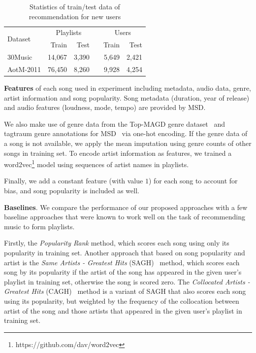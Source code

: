\begin{table}[!h]
\centering
\caption{Statistics of train/test data of recommendation for new users}
\label{tab:stats_cold}
\begin{tabular}{lrrcrr}
\toprule
\multirow{2}{*}{Dataset}  & \multicolumn{2}{c}{Playlists} && \multicolumn{2}{c}{Users} \\ \cmidrule{2-3} \cmidrule{5-6}
                          & Train & Test && Train & Test \\
\midrule
30Music   & 14,067 & 3,390 && 5,649 & 2,421 \\
AotM-2011 & 76,450 & 8,260 && 9,928 & 4,254 \\
\bottomrule
\end{tabular}
\end{table}


{\bf Features} of each song used in experiment including metadata, audio data, genre, artist information and song popularity.
Song metadata (\eg duration, year of release) and audio features (\eg loudness, mode, tempo) are provided by MSD.

We also make use of genre data from the Top-MAGD genre dataset~\cite{schindler2012facilitating}
and tagtraum genre annotations for MSD~\cite{schreiber2015improving} via one-hot encoding.
If the genre data of a song is not available, we apply the mean imputation using genre counts of other songs in training set.
To encode artist information as features,
we trained a word2vec\footnote{https://github.com/dav/word2vec} model using sequences of artist names in playlists.

Finally, we add a constant feature (with value $1$) for each song to account for bias, and song popularity is included as well.


{\bf Baselines}.
We compare the performance of our proposed approaches with a few baseline approaches
that were known to work well on the task of recommending music to form playlists.

Firstly, the {\it Popularity Rank} method, which scores each song using only its popularity in training set.
%
Another approach that based on song popularity and artist is the {\it Same Artists - Greatest Hits} (SAGH)~\cite{mcfee2012million} method,
which scores each song by its popularity if the artist of the song has appeared in the given user's playlist in training set,
otherwise the song is scored zero.
%
The {\it Collocated Artists - Greatest Hits} (CAGH)~\cite{bonnin2013evaluating} method is a variant of SAGH
that also scores each song using its popularity, but weighted by the frequency of the collocation between artist of the song
and those artists that appeared in the given user's playlist in training set.

